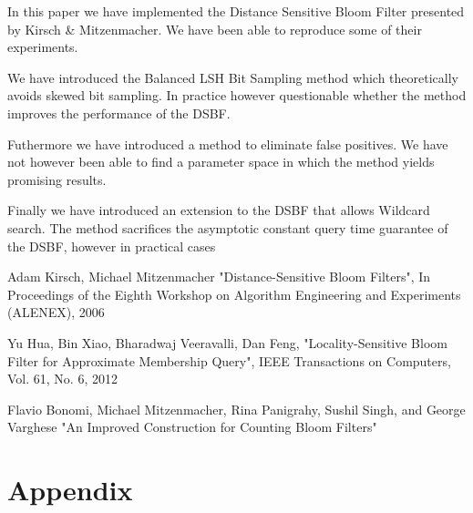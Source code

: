 \documentclass[a4paper,11pt]{article}
\begin{document}
In this paper we have implemented the Distance Sensitive Bloom Filter\cite{paper:harvard} presented by Kirsch & Mitzenmacher. We have been able to reproduce some of their experiments.

We have introduced the Balanced LSH Bit Sampling method which theoretically avoids skewed bit sampling. In practice however questionable whether the method improves the performance of the DSBF.

Futhermore we have introduced a method to eliminate false positives. We have not however been able to find a parameter space in which the method yields promising results.

Finally we have introduced an extension to the DSBF that allows Wildcard search. The method sacrifices the asymptotic constant query time guarantee of the DSBF, however in practical cases


\newpage

\begin{thebibliography}{}

Adam Kirsch, Michael Mitzenmacher
"Distance-Sensitive Bloom Filters", In Proceedings of the Eighth Workshop on Algorithm Engineering and Experiments (ALENEX), 2006

Yu Hua, Bin Xiao, Bharadwaj Veeravalli, Dan Feng, "Locality-Sensitive Bloom Filter for Approximate Membership Query", IEEE Transactions on Computers, Vol. 61, No. 6, 2012


Flavio Bonomi, Michael Mitzenmacher, Rina Panigrahy, Sushil Singh, and George Varghese
"An Improved Construction for Counting Bloom Filters"

\end{thebibliography}

\section*{Appendix}
\appendix
\end{document}
